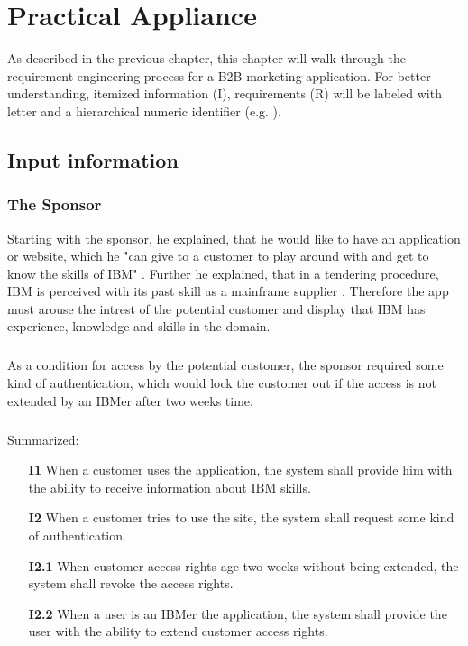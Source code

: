 \chapter{Practical Appliance}
As described in the previous chapter, this chapter will walk through the requirement engineering process for a B2B marketing application. For better understanding, itemized information (I), requirements (R) will be labeled with letter and a hierarchical numeric identifier (e.g. ).
\section{Input information}
\subsection{The Sponsor}
Starting with the sponsor, he explained, that he would like to have an application or website, which he "can give to a customer to play around with and get to know the skills of IBM" \parencite{Sachs.20.04.2017}. Further he explained, that in a tendering procedure, IBM is perceived with its past skill as a mainframe supplier \parencite{Sachs.20.04.2017}. Therefore the app must arouse the intrest of the potential customer and display that IBM has experience, knowledge and skills in the domain. 

\paragraph{} As a condition for access by the potential customer, the sponsor required some kind of authentication, which would lock the customer out if the access is not extended by an IBMer after two weeks time.

\paragraph{} Summarized:

\begin{itemize}
    \item [\textbf{I1}] When a customer uses the application, the system shall provide him with the ability to receive information about IBM skills.
    \item [\textbf{I2}] When a customer tries to use the site, the system shall request some kind of authentication.
    \item [\textbf{I2.1}] When customer access rights age two weeks without being extended, the system shall revoke the access rights.
    \item [\textbf{I2.2}\label{R2.2}] When a user is an IBMer the application, the system shall provide the user with the ability to extend customer access rights.
\end{itemize}


